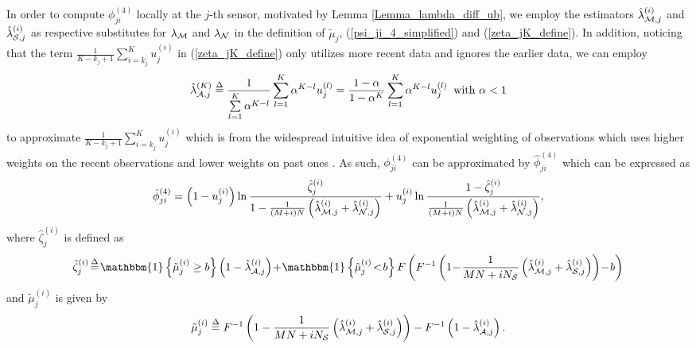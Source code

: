 \documentclass[11pt, draftclsnofoot, onecolumn]{IEEEtran}
\newcommand{\cS}{\mathcal{S}}
\newcommand{\bone}{\mathbbm{1}}
\begin{document}
In order to compute $\phi _{ji}^{\left( 4 \right)}$ locally at the $j$-th sensor, motivated by Lemma \ref{Lemma_lambda_diff_ub}, we employ the estimators ${\hat \lambda _{{\cal M},j}^{(i)}}$  and ${\hat \lambda _{{\cal S},j}^{(i)}}$ as respective substitutes for  ${\lambda _{\cal M}}$ and ${\lambda _{\cal N}}$ in the definition of ${{\tilde \mu }_j}$,  (\ref{psi_ji_4_simplified}) and (\ref{zeta_jK_define}). In addition, noticing that the term ${\frac{1}{{K - {k_j} + 1}}\sum_{i = {k_j}}^K {u_j^{(i)}} }$ in (\ref{zeta_jK_define}) only utilizes more recent data and ignores the  earlier data,
we can employ 
\begin{equation} \label{hat_lambda_A}
\hat \lambda _{{\cal A},j}^{(K)} \buildrel \Delta \over = \frac{1}{{\sum\limits_{l = 1}^K {{\alpha ^{K - l}}} }}\sum\limits_{l = 1}^K {{\alpha ^{K - l}}u_j^{(l)}}  = \frac{{1 - \alpha }}{{1 - {\alpha ^K}}}\sum\limits_{l = 1}^K {{\alpha ^{K - l}}u_j^{(l)}} \;\; \text{with  } \alpha<1
\end{equation} 
to approximate ${\frac{1}{{K - {k_j} + 1}}\sum_{i = {k_j}}^K {u_j^{(i)}} }$ which is from the widespread intuitive idea of exponential weighting of observations which uses higher weights on the recent observations and lower weights on past ones \cite{basseville1993detection, tartakovsky2014sequential}. 
As such, ${\phi _{ji}^{\left( 4 \right)}}$ can be approximated by $\hat \phi _{ji}^{\left( 4 \right)}$ which can be expressed as
\begin{align} \label{hat_phi_ji_4}
\hat \phi _{ji}^{\left( 4 \right)} = \left( {1 - u_j^{(i)}} \right)\ln \frac{{\hat \zeta _j^{(i)}}}{{1 - \frac{1}{{\left( {M + i} \right)N}}\left( {\hat \lambda _{{\cal M},j}^{(i)} + \hat \lambda _{{\cal N},j}^{(i)}} \right)}} + u_j^{(i)}\ln \frac{{1 - \hat \zeta _j^{(i)}}}{{\frac{1}{{\left( {M + i} \right)N}}\left( {\hat \lambda _{{\cal M},j}^{(i)} + \hat \lambda _{{\cal N},j}^{(i)}} \right)}},
\end{align}
where ${\hat \zeta _j^{(i)}}$ is defined as
\begin{align} \label{hat_zeta_ji}
\hat \zeta _j^{(i)} \! \buildrel \Delta \over = \! \bone\left\{ {\tilde \mu _j^{(i)} \ge b} \right\}\left( {1 - \hat \lambda _{{\cal A},j}^{(i)}} \right) \! + \! \bone\left\{ {\tilde \mu _j^{(i)} \! < \! b} \right\}F\left( {{F^{ - 1}}\left( {1 \! - \! \frac{1}{{ {MN + iN_{\cS}} }}\left( {\hat \lambda _{{\cal M},j}^{(i)} + \hat \lambda _{{\cal S},j}^{(i)}} \right)} \right) \! - \!  b} \right)
\end{align}
and ${\tilde \mu _j^{(i)}}$ is given by
\begin{equation} \label{tilde_mu_j_i}
\tilde \mu _j^{(i)} \buildrel \Delta \over = {F^{ - 1}}\left( {1 - \frac{1}{{{MN + iN_{\cS}}}}\left( {\hat \lambda _{{\cal M},j}^{(i)} + \hat \lambda _{{\cal S},j}^{(i)}} \right)} \right) - {F^{ - 1}}\left( {1 - \hat \lambda _{{\cal A},j}^{(i)}} \right).
\end{equation}
\end{document}
